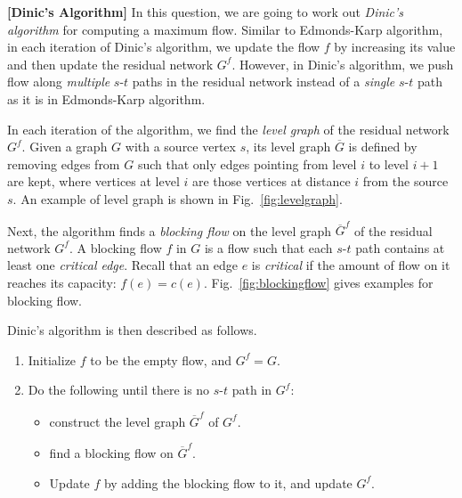 \documentclass{oxmathproblems}
\begin{document}
\begin{questions}

\miquestion[Bonus 60]
\textbf{[Dinic's Algorithm]}
In this question, we are going to work out \emph{Dinic's algorithm} for computing a maximum flow.
Similar to Edmonds-Karp algorithm, in each iteration of Dinic's algorithm, we update the flow $f$ by increasing its value and then update the residual network $G^f$.
However, in Dinic's algorithm, we push flow along \emph{multiple} $s$-$t$ paths in the residual network instead of a \emph{single} $s$-$t$ path as it is in Edmonds-Karp algorithm.

In each iteration of the algorithm, we find the \emph{level graph} of the residual network $G^f$.
Given a graph $G$ with a source vertex $s$, its level graph $\overline{G}$ is defined by removing edges from $G$ such that only edges pointing from level $i$ to level $i+1$ are kept, where vertices at level $i$ are those vertices at distance $i$ from the source $s$.
An example of level graph is shown in Fig.~\ref{fig:levelgraph}.

Next, the algorithm finds a \emph{blocking flow} on the level graph $\overline{G}^f$ of the residual network $G^f$.
A blocking flow $f$ in $G$ is a flow such that each $s$-$t$ path contains at least one \emph{critical edge}.
Recall that an edge $e$ is \emph{critical} if the amount of flow on it reaches its capacity: $f(e)=c(e)$.
Fig.~\ref{fig:blockingflow} gives examples for blocking flow.

Dinic's algorithm is then described as follows.
\begin{enumerate}
    \item Initialize $f$ to be the empty flow, and $G^f=G$.
    \item Do the following until there is no $s$-$t$ path in $G^f$:
    \begin{itemize}
        \item construct the level graph $\overline{G}^f$ of $G^f$.
        \item find a blocking flow on $\overline{G}^f$.
        \item Update $f$ by adding the blocking flow to it, and update $G^f$.
    \end{itemize}
\end{enumerate}


\end{questions}
\end{document}
